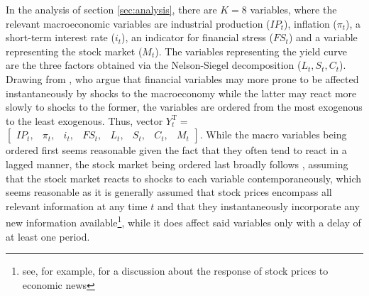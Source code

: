 
In the analysis of section \ref{sec:analysis}, there are $K=8$ variables, where the relevant macroeconomic variables are industrial production ($IP_t$), inflation ($\pi_t$), a short-term interest rate ($i_t$), an indicator for financial stress ($FS_t$) and a variable representing the stock market ($M_t$).
The variables representing the yield curve are the three factors obtained via the Nelson-Siegel decomposition ($L_t, S_t, C_t$). 
Drawing from \citet{martins2010level}, who argue that financial variables may more prone to be affected instantaneously by shocks to the macroeconomy while the latter may react more slowly to shocks to the former, the variables are ordered from the most exogenous to the least exogenous. Thus, vector $Y^{\mathrm{T}}_{t} =$ 
$\left[ 
\begin{array}{cccccccc}
     IP_{t}, &  \pi_{t}, & i_{t}, & FS_{t}, & L_{t}, & S_{t}, & C_{t}, & M_{t} 
\end{array}
\right]$. While the macro variables being ordered first seems reasonable given the fact that they often tend to react in a lagged manner, the stock market being ordered last broadly follows \citet{kilian2009impact}, assuming that the stock market reacts to shocks to each variable contemporaneously, which seems reasonable as it is generally assumed that stock prices encompass all relevant information at any time $t$ and that they instantaneously incorporate any new information available\footnote{see, for example, \citet{pearce1984stock, beaudry2006stock, ormos2011impacts} for a discussion about the response of stock prices to economic news}, while it does affect said variables only with a delay of at least one period.


